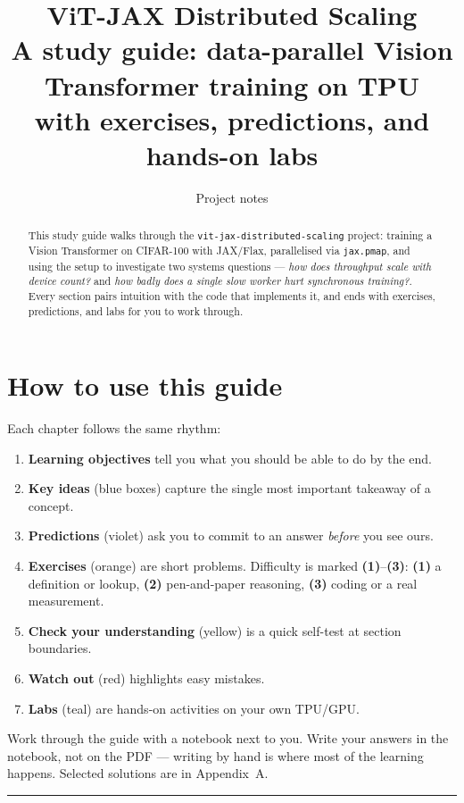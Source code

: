 \documentclass[11pt,a4paper]{article}
\title{\textbf{ViT-JAX Distributed Scaling}\\
       \large A study guide: data-parallel Vision Transformer training on TPU\\
       \normalsize with exercises, predictions, and hands-on labs}
\author{Project notes}
\date{}
\newcounter{exercise}[section]
\newcounter{lab}
\newcommand{\stars}[1]{\textbf{\small(#1)}}
\begin{document}
\maketitle

\begin{abstract}
\noindent This study guide walks through the \texttt{vit-jax-distributed-scaling}
project: training a Vision Transformer on CIFAR-100 with JAX/Flax, parallelised via
\texttt{jax.pmap}, and using the setup to investigate two systems questions ---
\emph{how does throughput scale with device count?} and \emph{how badly does a single
slow worker hurt synchronous training?}. Every section pairs intuition with the code
that implements it, and ends with exercises, predictions, and labs for you to work through.
\end{abstract}

\section*{How to use this guide}

Each chapter follows the same rhythm:
\begin{enumerate}
    \item \textbf{Learning objectives} tell you what you should be able to do by the end.
    \item \textbf{Key ideas} (blue boxes) capture the single most important takeaway of a concept.
    \item \textbf{Predictions} (violet) ask you to commit to an answer \emph{before} you see ours.
    \item \textbf{Exercises} (orange) are short problems. Difficulty is marked \stars{1}--\stars{3}:
          \stars{1} a definition or lookup, \stars{2} pen-and-paper reasoning, \stars{3} coding or a real measurement.
    \item \textbf{Check your understanding} (yellow) is a quick self-test at section boundaries.
    \item \textbf{Watch out} (red) highlights easy mistakes.
    \item \textbf{Labs} (teal) are hands-on activities on your own TPU/GPU.
\end{enumerate}

\noindent Work through the guide with a notebook next to you. Write your answers in the
notebook, not on the PDF --- writing by hand is where most of the learning happens.
Selected solutions are in Appendix~A.

\tableofcontents
\vspace{1em}
\hrule
\vspace{1em}
\end{document}
